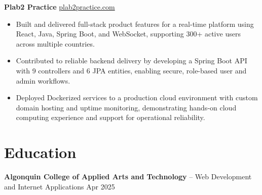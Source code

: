 \documentclass[11pt]{article}       %
\begin{document}
\textbf{Plab2 Practice} \hfill \href{https://plab2practice.com}{plab2practice.com} \\
\vspace{-9pt}
\begin{itemize}
  \item Built and delivered full-stack product features for a real-time platform using React, Java, Spring Boot, and WebSocket, supporting 300+ active users across multiple countries.
  \item Contributed to reliable backend delivery by developing a Spring Boot API with 9 controllers and 6 JPA entities, enabling secure, role-based user and admin workflows.
  \item Deployed Dockerized services to a production cloud environment with custom domain hosting and uptime monitoring, demonstrating hands-on cloud computing experience and support for operational reliability.
\end{itemize}





\section*{Education}
\textbf{Algonquin College of Applied Arts and Technology} -- Web Development and Internet Applications
\hfill Apr 2025 \\
\end{document}
